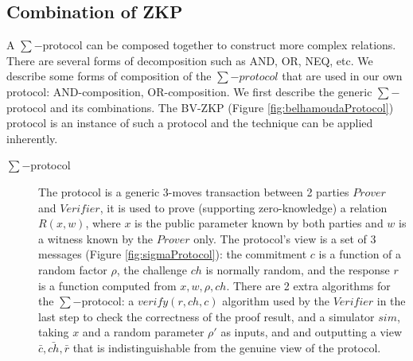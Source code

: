 \subsection{Combination of ZKP}
\label{sec:combination-zkp}
A $\sum-$protocol can be composed together to construct more complex relations.
There are several forms of decomposition such as AND, OR, NEQ, etc.  We describe
some forms of composition of the \(\sum-protocol\) that are used in our own protocol:
AND-composition, OR-composition. We first describe the generic \(\sum-\)protocol
and its combinations. The BV-ZKP (Figure \ref{fig:belhamoudaProtocol}) protocol
is an instance of such a protocol and the technique can be applied inherently.
\begin{description}
\item[$\sum-$protocol] The protocol is a generic 3-moves transaction between 2 parties
  \(Prover\) and \(Verifier\), it is used to prove (supporting zero-knowledge) a
  relation \(R(x,w)\), where \(x\) is the public parameter known by both
  parties and \(w\) is a witness known by the \(Prover\) only. The protocol's
  view is a set of 3 messages (Figure \ref{fig:sigmaProtocol}): the commitment
  \(c\) is a function of a random factor \(\rho\), the challenge \(ch\) is
  normally random, and the response \(r\) is a function computed from
  \(x, w, \rho, ch\). There are 2 extra algorithms for the \(\sum-\)protocol: a
  \(verify(r,ch,c)\) algorithm used by the \(Verifier\) in the last step to
  check the correctness of the proof result, and a simulator \(sim\), taking
  \(x\) and a random parameter \(\rho'\) as inputs, and and outputting a view
  \(\bar{c},\bar{ch},\bar{r}\) that is indistinguishable from the genuine view
  of the protocol.


\end{description}
